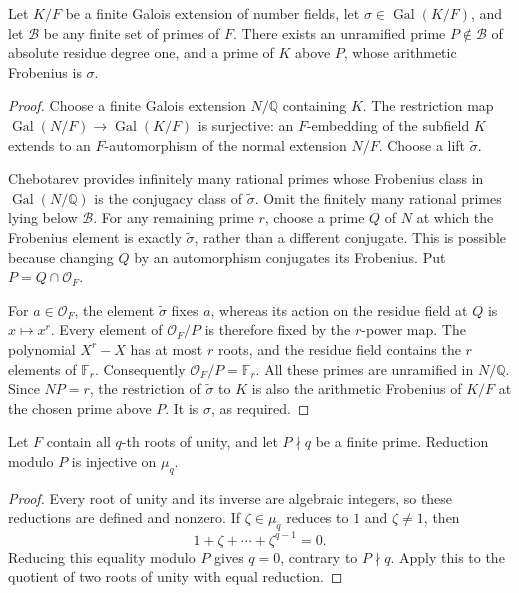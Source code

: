 \begin{lemma}\label{sd-degree-one}
Let \(K/F\) be a finite Galois extension of number fields,
let \(\sigma\in\operatorname{Gal}(K/F)\), and let
\(\mathcal B\) be any finite set of primes of \(F\).
There exists an unramified prime \(P\notin\mathcal B\)
of absolute residue degree one, and a prime of \(K\)
above \(P\), whose arithmetic Frobenius is \(\sigma\).
\end{lemma}
\begin{proof}
Choose a finite Galois extension \(N/\mathbb Q\)
containing \(K\).  The restriction map
\(\operatorname{Gal}(N/F)\to\operatorname{Gal}(K/F)\)
is surjective: an \(F\)-embedding of the subfield \(K\)
extends to an \(F\)-automorphism of the normal
extension \(N/F\).
Choose a lift \(\widetilde\sigma\).

Chebotarev provides infinitely many rational primes
whose Frobenius class in \(\operatorname{Gal}(N/\mathbb Q)\)
is the conjugacy class of \(\widetilde\sigma\).
Omit the finitely many rational primes lying below
\(\mathcal B\).
For any remaining prime \(r\), choose a prime \(Q\) of
\(N\) at which the Frobenius element is exactly
\(\widetilde\sigma\), rather than a different conjugate.
This is possible because changing \(Q\) by an
automorphism conjugates its Frobenius.
Put \(P=Q\cap\mathcal O_F\).

For \(a\in\mathcal O_F\), the element
\(\widetilde\sigma\) fixes \(a\), whereas its action
on the residue field at \(Q\) is \(x\mapsto x^r\).
Every element of \(\mathcal O_F/P\) is therefore
fixed by the \(r\)-power map.  The polynomial
\(X^r-X\) has at most \(r\) roots, and the residue
field contains the \(r\) elements of \(\mathbb F_r\).
Consequently \(\mathcal O_F/P=\mathbb F_r\).
All these primes are unramified in \(N/\mathbb Q\).
Since \(NP=r\), the restriction of
\(\widetilde\sigma\) to \(K\) is also the arithmetic
Frobenius of \(K/F\) at the chosen prime above \(P\).
It is \(\sigma\), as required.
\end{proof}

\begin{lemma}\label{sd-roots-reduce}
Let \(F\) contain all \(q\)-th roots of unity, and let
\(P\nmid q\) be a finite prime.
Reduction modulo \(P\) is injective on \(\mu_q\).
\end{lemma}
\begin{proof}
Every root of unity and its inverse are algebraic integers,
so these reductions are defined and nonzero.
If \(\zeta\in\mu_q\) reduces to \(1\) and \(\zeta\ne1\),
then
\[
             1+\zeta+\cdots+\zeta^{q-1}=0.
\]
Reducing this equality modulo \(P\) gives \(q=0\),
contrary to \(P\nmid q\).
Apply this to the quotient of two roots of unity
with equal reduction.
\end{proof}

